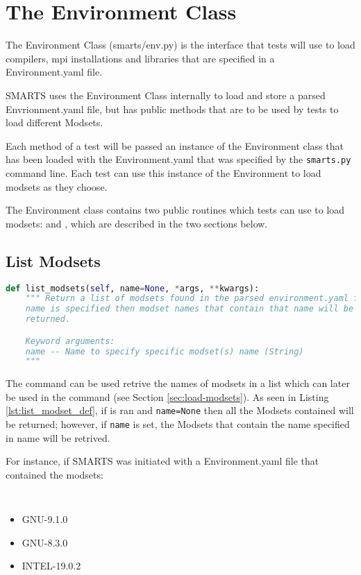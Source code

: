 \chapter{The Environment Class}
\label{chap:environment_class}

The Environment Class (smarts/env.py) is the interface that tests will use to
load compilers, mpi installations and libraries that are specified in a
Environment.yaml file. 

SMARTS uses the Environment Class internally to load and store a parsed
Envrionment.yaml file, but has public methods that are to be used by tests to
load different Modsets.

Each \testRun method of a test will be passed an instance of the Environment
class that has been loaded with the Environment.yaml that was specified by the
{\tt smarts.py} command line. Each test can use this instance of the
Environment to load modsets as they choose.

The Environment class contains two public routines which tests can use to load
modsets: \listModsets and \loadModset, which are described in the two sections
below.

\section{List Modsets}
\label{sec:list-modsets}

\begin{lstlisting}[language=Python, 
                   caption={list\_modset Definition},
                   label={lst:list_modset_def}]
def list_modsets(self, name=None, *args, **kwargs):
    """ Return a list of modsets found in the parsed environment.yaml file, if
    name is specified then modset names that contain that name will be
    returned.

    Keyword arguments:
    name -- Name to specify specific modset(s) name (String)
    """
\end{lstlisting}

The \listModsets command can be used retrive the names of modsets in a list
which can later be used in the \loadModset command (see Section
\ref{sec:load-modsets}). As seen in Listing \ref{lst:list_modset_def}, if
\listModsets is ran and {\tt name=None} then all the Modsets contained will be
returned; however, if {\tt name} is set, the Modsets that contain the name
specified in name will be retrived.

For instance, if SMARTS was initiated with a Environment.yaml file that
contained the modsets:
{\tt
\begin{itemize}
\item GNU-9.1.0
\item GNU-8.3.0
\item INTEL-19.0.2
\end{itemize}
}


